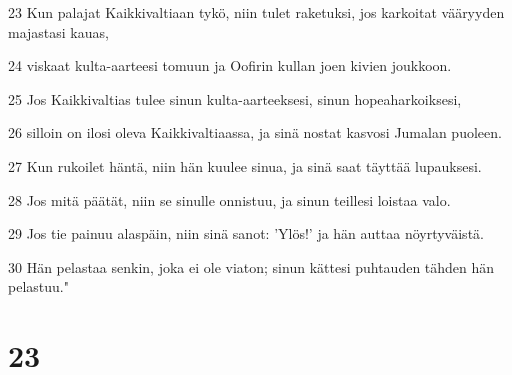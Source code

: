 \par 23 Kun palajat Kaikkivaltiaan tykö, niin tulet raketuksi, jos karkoitat vääryyden majastasi kauas,
\par 24 viskaat kulta-aarteesi tomuun ja Oofirin kullan joen kivien joukkoon.
\par 25 Jos Kaikkivaltias tulee sinun kulta-aarteeksesi, sinun hopeaharkoiksesi,
\par 26 silloin on ilosi oleva Kaikkivaltiaassa, ja sinä nostat kasvosi Jumalan puoleen.
\par 27 Kun rukoilet häntä, niin hän kuulee sinua, ja sinä saat täyttää lupauksesi.
\par 28 Jos mitä päätät, niin se sinulle onnistuu, ja sinun teillesi loistaa valo.
\par 29 Jos tie painuu alaspäin, niin sinä sanot: 'Ylös!' ja hän auttaa nöyrtyväistä.
\par 30 Hän pelastaa senkin, joka ei ole viaton; sinun kättesi puhtauden tähden hän pelastuu."

\chapter{23}

